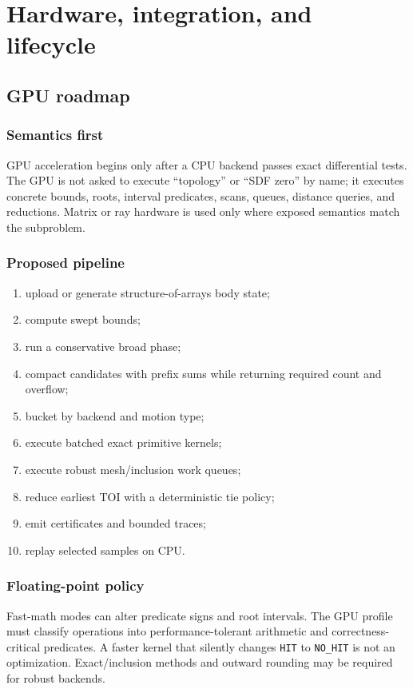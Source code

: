 \documentclass[11pt,a4paper,openany]{book}
\newcommand{\status}[1]{\texttt{#1}}
\begin{document}
\part{Hardware, integration, and lifecycle}

\chapter{GPU roadmap}
\section{Semantics first}
GPU acceleration begins only after a CPU backend passes exact differential tests. The GPU is not asked to execute ``topology'' or ``SDF zero'' by name; it executes concrete bounds, roots, interval predicates, scans, queues, distance queries, and reductions. Matrix or ray hardware is used only where exposed semantics match the subproblem.

\section{Proposed pipeline}
\begin{enumerate}
  \item upload or generate structure-of-arrays body state;
  \item compute swept bounds;
  \item run a conservative broad phase;
  \item compact candidates with prefix sums while returning required count and overflow;
  \item bucket by backend and motion type;
  \item execute batched exact primitive kernels;
  \item execute robust mesh/inclusion work queues;
  \item reduce earliest TOI with a deterministic tie policy;
  \item emit certificates and bounded traces;
  \item replay selected samples on CPU.
\end{enumerate}

\section{Floating-point policy}
Fast-math modes can alter predicate signs and root intervals. The GPU profile must classify operations into performance-tolerant arithmetic and correctness-critical predicates. A faster kernel that silently changes \status{HIT} to \status{NO\_HIT} is not an optimization. Exact/inclusion methods and outward rounding may be required for robust backends.
\end{document}
